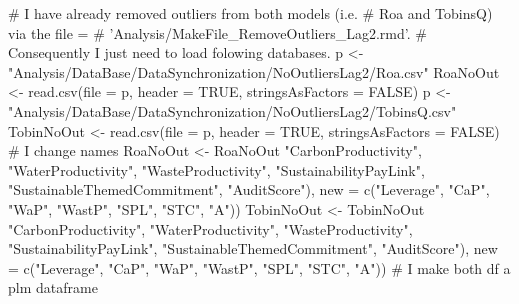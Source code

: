 \documentclass[12pt,]{article}
\newenvironment{Shaded}{}{}
\newcommand{\KeywordTok}[1]{\textcolor[rgb]{0.00,0.00,1.00}{#1}}
\newcommand{\DataTypeTok}[1]{#1}
\newcommand{\StringTok}[1]{\textcolor[rgb]{0.00,0.50,0.50}{#1}}
\newcommand{\CommentTok}[1]{\textcolor[rgb]{0.00,0.50,0.00}{#1}}
\newcommand{\OtherTok}[1]{\textcolor[rgb]{1.00,0.25,0.00}{#1}}
\newcommand{\OperatorTok}[1]{#1}
\newcommand{\NormalTok}[1]{#1}
\begin{document}
\begin{Shaded}
\begin{Highlighting}[]
\CommentTok{# I have already removed outliers from both models (i.e.}
\CommentTok{# Roa and TobinsQ) via the file =}
\CommentTok{# 'Analysis/MakeFile_RemoveOutliers_Lag2.rmd'.}
\CommentTok{# Consequently I just need to load folowing databases.}
\NormalTok{p <-}\StringTok{ "Analysis/DataBase/DataSynchronization/NoOutliersLag2/Roa.csv"}
\NormalTok{RoaNoOut <-}\StringTok{ }\KeywordTok{read.csv}\NormalTok{(}\DataTypeTok{file =}\NormalTok{ p, }\DataTypeTok{header =} \OtherTok{TRUE}\NormalTok{, }\DataTypeTok{stringsAsFactors =} \OtherTok{FALSE}\NormalTok{)}
\NormalTok{p <-}\StringTok{ "Analysis/DataBase/DataSynchronization/NoOutliersLag2/TobinsQ.csv"}
\NormalTok{TobinNoOut <-}\StringTok{ }\KeywordTok{read.csv}\NormalTok{(}\DataTypeTok{file =}\NormalTok{ p, }\DataTypeTok{header =} \OtherTok{TRUE}\NormalTok{, }\DataTypeTok{stringsAsFactors =} \OtherTok{FALSE}\NormalTok{)}
\CommentTok{# I change names}
\NormalTok{RoaNoOut <-}\StringTok{ }\NormalTok{RoaNoOut }\OperatorTok{%
    \StringTok{"CarbonProductivity"}\NormalTok{, }\StringTok{"WaterProductivity"}\NormalTok{, }\StringTok{"WasteProductivity"}\NormalTok{, }
    \StringTok{"SustainabilityPayLink"}\NormalTok{, }\StringTok{"SustainableThemedCommitment"}\NormalTok{, }
    \StringTok{"AuditScore"}\NormalTok{), }\DataTypeTok{new =} \KeywordTok{c}\NormalTok{(}\StringTok{"Leverage"}\NormalTok{, }\StringTok{"CaP"}\NormalTok{, }\StringTok{"WaP"}\NormalTok{, }\StringTok{"WastP"}\NormalTok{, }
    \StringTok{"SPL"}\NormalTok{, }\StringTok{"STC"}\NormalTok{, }\StringTok{"A"}\NormalTok{))}
\NormalTok{TobinNoOut <-}\StringTok{ }\NormalTok{TobinNoOut }\OperatorTok{%
    \StringTok{"CarbonProductivity"}\NormalTok{, }\StringTok{"WaterProductivity"}\NormalTok{, }\StringTok{"WasteProductivity"}\NormalTok{, }
    \StringTok{"SustainabilityPayLink"}\NormalTok{, }\StringTok{"SustainableThemedCommitment"}\NormalTok{, }
    \StringTok{"AuditScore"}\NormalTok{), }\DataTypeTok{new =} \KeywordTok{c}\NormalTok{(}\StringTok{"Leverage"}\NormalTok{, }\StringTok{"CaP"}\NormalTok{, }\StringTok{"WaP"}\NormalTok{, }\StringTok{"WastP"}\NormalTok{, }
    \StringTok{"SPL"}\NormalTok{, }\StringTok{"STC"}\NormalTok{, }\StringTok{"A"}\NormalTok{))}
\CommentTok{# I make both df a plm dataframe}
}}
\end{Highlighting}
\end{Shaded}
\end{document}
